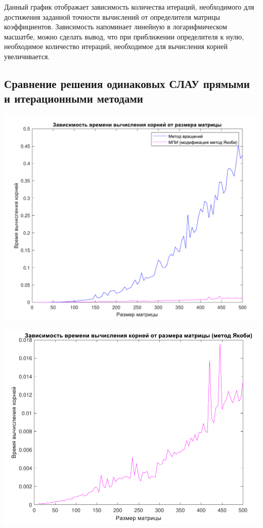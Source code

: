Данный график отображает зависимость количества итераций, необходимого для достижения заданной точности вычислений от определителя матрицы коэффициентов. Зависимость напоминает линейную в логарифмическом масшатбе, можно сделать вывод, что при приближении определителя к нулю, необходимое количество итераций, необходимое для вычисления корней увеличивается.

\subsection{Сравнение решения одинаковых СЛАУ прямыми и итерационными методами}

\includegraphics[scale=0.5]{3.pdf}

\includegraphics[scale=0.5]{4.pdf}

